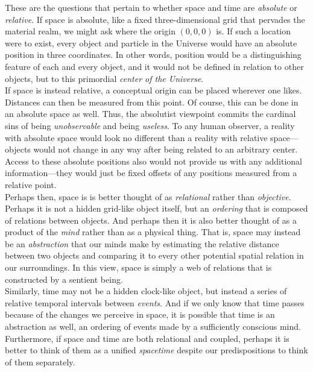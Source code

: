 These are the questions that pertain to whether space and time are \textit{absolute} or \textit{relative}. If space is absolute, like a fixed three-dimensional grid that pervades the material realm, we might ask where the origin $(0,0,0)$ is. If such a location were to exist, every object and particle in the Universe would have an absolute position in three coordinates. In other words, position would be a distinguishing feature of each and every object, and it would not be defined in relation to other objects, but to this primordial \textit{center of the Universe}. \\

If space is instead relative, a conceptual origin can be placed wherever one likes. Distances can then be measured from this point. Of course, this can be done in an absolute space as well. Thus, the absolutist viewpoint commits the cardinal sins of being \textit{unobservable} and being \textit{useless}. To any human observer, a reality with absolute space would look no different than a reality with relative space---objects would not change in any way after being related to an arbitrary center. Access to these absolute positions also would not provide us with any additional information---they would just be fixed offsets of any positions measured from a relative point. \\

Perhaps then, space is is better thought of as \textit{relational} rather than \textit{objective}. Perhaps it is not a hidden grid-like object itself, but an \textit{ordering} that is composed of relations between objects. And perhaps then it is also better thought of as a product of the \textit{mind} rather than as a physical thing. That is, space may instead be an \textit{abstraction} that our minds make by estimating the relative distance between two objects and comparing it to every other potential spatial relation in our surroundings. In this view, space is simply a web of relations that is constructed by a sentient being. \\

Similarly, time may not be a hidden clock-like object, but instead a series of relative temporal intervals between \textit{events}. And if we only know that time passes because of the changes we perceive in space, it is possible that time is an abstraction as well, an ordering of events made by a sufficiently conscious mind. Furthermore, if space and time are both relational and coupled, perhaps it is better to think of them as a unified \textit{spacetime} despite our predispositions to think of them separately. \\

